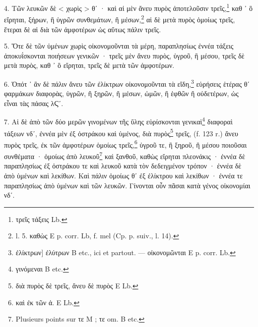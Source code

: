 \documentclass[a4paper, 11pt, oneside, polutonikogreek, french]{article}
\begin{document}
4. Τῶν λευκῶν δὲ < χωρὶς > θʹ · καὶ αἱ μὲν ἄνευ πυρὸς ἀποτελοῦσιν τρεῖς,\footnote{τρεῖς τάξεις Lb.} καθ ᾽ ὃ εἴρηται, ξήρων, ἢ ὑγρῶν συνθεμάτων, ἢ μέσων,\footnote{l. 5. καθὼς E p. corr. Lb, f. mel (Cp. p. suiv., l. 14).} αἱ δὲ μετὰ πυρὸς ὁμοίως τρεῖς, ἕτεραι δὲ αἱ διὰ τῶν ἀμφοτέρων ὡς αὕτως πάλιν τρεῖς.

5. Ὅτε δὲ τῶν ὑμένων χωρὶς οἰκονομοῦνται τὰ μέρη, παραπλησίως ἐννέα τάξεις ἀποκυΐσκονται ποιήσεων γενικῶν · τρεῖς μὲν ἄνευ πυρὸς, ὑγροῦ, ἢ μέσου, τρεῖς δὲ μετὰ πυρὸς, καθ ᾽ ὃ εἴρηται, τρεῖς δὲ μετὰ τῶν ἀμφοτέρων.

6. Ὁπότ ᾽ ἂν δὲ πάλιν ἄνευ τῶν ἐλίκτρων οἰκονομοῦνται τὰ εἴδη,\footnote{ἐλίκτρων] ἐλύτρων B etc., ici et partout. --- οἰκονομῶνται E p. corr. Lb.} εὑρήσεις ἑτέρας θʹ φαρμάκων διαφορὰς, ὑγρῶν, ἢ ξηρῶν, ἢ μέσων, ὠμῶν, ἢ ἑφθῶν ἢ οὐδετέρων, ὡς εἶναι τὰς πάσας λϚʹ.

7. Αἱ δὲ ἀπὸ τῶν δύο μερῶν γινομένων τῆς ὕλης εὑρίσκονται γενικαὶ\footnote{γινόμεναι B etc.} διαφοραὶ τάξεων νδʹ, ἐννέα μὲν ἐξ ὀστράκου καὶ ὑμένος, διὰ πυρὸς\footnote{διὰ πυρὸς δὲ τρεῖς, ἄνευ δὲ πυρὸς E Lb.} τρεῖς, (f. 123 r.) ἄνευ πυρὸς τρεῖς, ἐκ τῶν ἀμφοτέρων ὁμοίως τρεῖς,\footnote{καὶ ἐκ τῶν ἀ. E Lb.} ὑγροῦ τε, ἢ ξηροῦ, ἢ μέσου ποιοῦσαι συνθέματα · ὁμοίως ἀπὸ λευκοῦ\footnote{Plusieurs points sur τε M ; τε om. B etc.} καὶ ξανθοῦ, καθὼς εἴρηται πλεονάκις · ἐννέα δὲ παραπλησίως ἐξ ὀστράκου τε καὶ λευκοῦ κατὰ τὸν δεδειγμένον τρόπον · ἐννέα δὲ ἀπὸ ὑμένων καὶ λεκίθων. Καὶ πάλιν ὁμοίως θʹ ἐξ ἐλίκτρου καὶ λεκίθων · ἐννέα τε παραπλησίως ἀπὸ ὑμένων καὶ τῶν λευκῶν. Γίνονται οὖν πᾶσαι κατὰ γένος οἰκονομίαι νδʹ.
\end{document}
